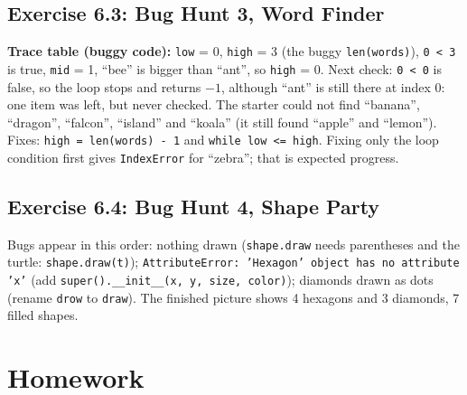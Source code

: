 \subsection{Exercise 6.3: Bug Hunt 3, Word Finder}
\begin{answer}
\textbf{Trace table (buggy code):} \texttt{low} = 0, \texttt{high} = 3 (the buggy \texttt{len(words)}), \texttt{0 < 3} is true, \texttt{mid} = 1, \enquote{bee} is bigger than \enquote{ant}, so \texttt{high} = 0. Next check: \texttt{0 < 0} is false, so the loop stops and returns $-1$, although \enquote{ant} is still there at index 0: one item was left, but never checked.
The starter could not find \enquote{banana}, \enquote{dragon}, \enquote{falcon}, \enquote{island} and \enquote{koala} (it still found \enquote{apple} and \enquote{lemon}). Fixes: \texttt{high = len(words) - 1} and \texttt{while low <= high}. Fixing only the loop condition first gives \texttt{IndexError} for \enquote{zebra}; that is expected progress.
\end{answer}

\subsection{Exercise 6.4: Bug Hunt 4, Shape Party}
\begin{answer}
Bugs appear in this order: nothing drawn (\texttt{shape.draw} needs parentheses and the turtle: \texttt{shape.draw(t)}); \texttt{AttributeError: 'Hexagon' object has no attribute 'x'} (add \texttt{super().\_\_init\_\_(x, y, size, color)}); diamonds drawn as dots (rename \texttt{drow} to \texttt{draw}). The finished picture shows 4 hexagons and 3 diamonds, 7 filled shapes.
\end{answer}

\section{Homework}
